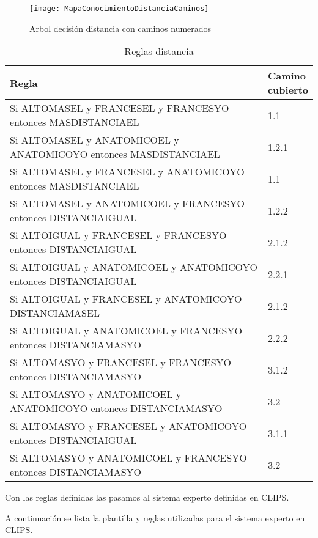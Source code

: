 \begin{figure}[htb]
  \centering
    \texttt{[image: MapaConocimientoDistanciaCaminos]}
  \caption[Arbol decisión distancia con caminos numerados]{Arbol decisión distancia con caminos numerados}
  \label{fig:Arbol decisión distancia con caminos numerados}
\end{figure}

\begin{longtable}[]{|p{0.9\linewidth} p{0.1\linewidth}|}
  \caption{Reglas distancia}
  \label{tab:Reglas distancia}

  \endfirsthead
  \endhead

  \hline
  Regla & Camino cubierto \\ \hline
  Si ALTOMASEL y FRANCESEL y FRANCESYO entonces MASDISTANCIAEL & 1.1 \\ \hline
  Si ALTOMASEL y ANATOMICOEL y ANATOMICOYO entonces MASDISTANCIAEL & 1.2.1 \\ \hline
  Si ALTOMASEL y FRANCESEL y ANATOMICOYO entonces MASDISTANCIAEL & 1.1 \\ \hline
  Si ALTOMASEL y ANATOMICOEL y FRANCESYO entonces DISTANCIAIGUAL & 1.2.2 \\ \hline
  Si ALTOIGUAL y FRANCESEL y FRANCESYO entonces DISTANCIAIGUAL & 2.1.2 \\ \hline
  Si ALTOIGUAL y ANATOMICOEL y ANATOMICOYO entonces DISTANCIAIGUAL & 2.2.1 \\ \hline
  Si ALTOIGUAL y FRANCESEL y ANATOMICOYO DISTANCIAMASEL & 2.1.2 \\ \hline
  Si ALTOIGUAL y ANATOMICOEL y FRANCESYO entonces DISTANCIAMASYO & 2.2.2 \\ \hline
  Si ALTOMASYO y FRANCESEL y FRANCESYO entonces DISTANCIAMASYO & 3.1.2 \\ \hline
  Si ALTOMASYO y ANATOMICOEL y ANATOMICOYO entonces DISTANCIAMASYO & 3.2 \\ \hline
  Si ALTOMASYO y FRANCESEL y ANATOMICOYO entonces DISTANCIAIGUAL & 3.1.1 \\ \hline
  Si ALTOMASYO y ANATOMICOEL y FRANCESYO entonces DISTANCIAMASYO & 3.2 \\ \hline
\end{longtable}

Con las reglas definidas las pasamos al sistema experto definidas en CLIPS.

A continuación se lista la plantilla y reglas utilizadas para el sistema experto en CLIPS.


